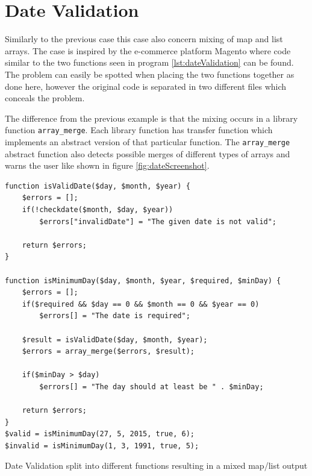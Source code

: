 \section{Date Validation}
Similarly to the previous case this case also concern mixing of map and list arrays. The case is inspired by the e-commerce platform Magento where code similar to the two functions seen in program \ref{lst:dateValidation} can be found. The problem can easily be spotted when placing the two functions together as done here, however the original code is separated in two different files which conceals the problem.

The difference from the previous example is that the mixing occurs in a library function \texttt{array\_merge}. Each library function has transfer function which implements an abstract version of that particular function. The \texttt{array\_merge} abstract function also detects possible merges of different types of arrays and warns the user like shown in figure \ref{fig:dateScreenshot}.

\begin{program}
\begin{lstlisting}
function isValidDate($day, $month, $year) {
    $errors = [];
    if(!checkdate($month, $day, $year))
        $errors["invalidDate"] = "The given date is not valid";

    return $errors;
}

function isMinimumDay($day, $month, $year, $required, $minDay) {
    $errors = [];
    if($required && $day == 0 && $month == 0 && $year == 0)
        $errors[] = "The date is required";

    $result = isValidDate($day, $month, $year);
    $errors = array_merge($errors, $result);

    if($minDay > $day)
        $errors[] = "The day should at least be " . $minDay;

    return $errors;
}
$valid = isMinimumDay(27, 5, 2015, true, 6);
$invalid = isMinimumDay(1, 3, 1991, true, 5);
\end{lstlisting}
\caption{Date Validation split into different functions resulting in a mixed map/list output}
\label{lst:dateValidation}
\end{program}


